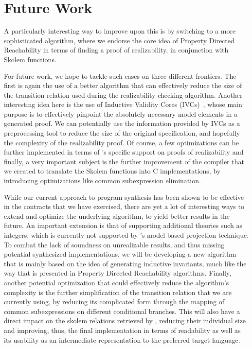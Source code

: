 \section{Future Work}
\label{sec:futurework}

A particularly interesting way to improve upon this is by switching to a more
sophisticated algorithm, where we endorse the core idea of Property Directed
Reachability in terms of finding a proof of realizability, in conjunction with Skolem functions.

For future work, we hope to tackle such cases on three different frontiers. The
first is again the use of a better algorithm that can effectively reduce the size of
the transition relation used during the realizability checking algorithm.
Another interesting idea here is the use of Inductive Validity Cores
(IVCs)~\cite{Ghass16}, whose main purpose is to effectively pinpoint the
absolutely necessary model elements in a generated proof. We can potentially use the
information provided by IVCs as a preprocessing tool to reduce the size of
the original specification, and hopefully the complexity of the realizability
proof. Of course, a few optimizations can be further implemented in terms of
\aeval's specific support on proofs of realizability and finally, a very
important subject is the further improvement of the compiler that we created to
translate the Skolem functions into C implementations, by introducing
optimizations like common subexpression elimination.


While our current approach to program synthesis has been shown to be effective
in the contracts that we have exercised, there are yet a lot of interesting ways
to extend and optimize the underlying algorithm, to yield better results in the
future. An important extension is that of supporting additional theories such as
integers, which is currently not supported by \aeval's model based projection
technique. To combat the lack of soundness on unrealizable results, and thus
missing potential synthesized implementations, we will be developing a new
algorithm that is mainly based on the idea of generating inductive invariants,
much like the way that is presented in Property Directed Reachability
algorithms. Finally, another potential optimization that could effectively
reduce the algorithm's complexity is the further simplification of the
transition relation that we are currently using, by reducing its complicated
form through the mapping of common subexpressions on different conditional
branches. This will also have a direct impact on the skolem relations retrieved
by \aeval, reducing their individual size and improving, thus, the final
implementation in terms of readability as well as its usability as an
intermediate representation to the preferred target language.

